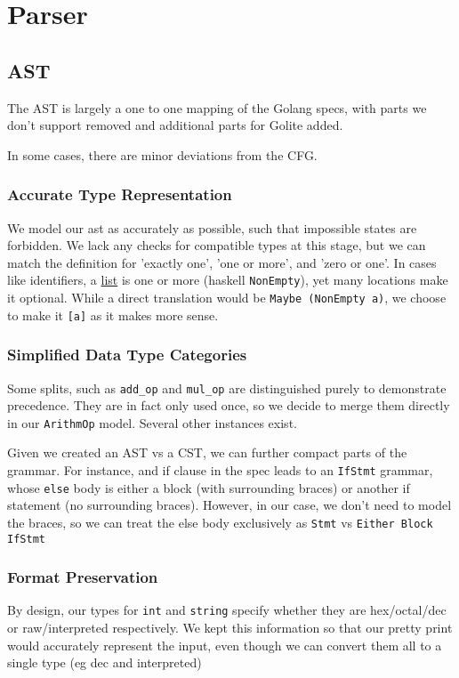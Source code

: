 \documentclass[11pt]{article}
\begin{document}
\section{Parser}
\label{sec:orgbc2e7ad}
\subsection{AST}
\label{sec:orgb539d01}
The AST is largely a one to one mapping of the Golang specs, with
parts we don't support removed and additional parts for Golite added.

In some cases, there are minor deviations from the CFG.
\subsubsection{Accurate Type Representation}
\label{sec:org6de96ff}
We model our ast as accurately as possible, such that impossible
states are forbidden. We lack any checks for compatible types at
this stage, but we can match the definition for 'exactly one', 'one
or more', and 'zero or one'. In cases like identifiers, a \href{https://golang.org/ref/spec\#IdentifierList}{list} is
one or more (haskell \texttt{NonEmpty}), yet many locations make it
optional. While a direct translation would be \texttt{Maybe (NonEmpty a)},
we choose to make it \texttt{[a]} as it makes more sense.
\subsubsection{Simplified Data Type Categories}
\label{sec:org3918547}
Some splits, such as \texttt{add\_op} and \texttt{mul\_op} are distinguished
purely to demonstrate precedence. They are in fact only used once,
so we decide to merge them directly in our \texttt{ArithmOp}
model. Several other instances exist.

Given we created an AST vs a CST, we can further compact parts of
the grammar. For instance, and if clause in the spec leads to an
\texttt{IfStmt} grammar, whose \texttt{else} body is either a block (with
surrounding braces) or another if statement (no surrounding
braces). However, in our case, we don't need to model the braces,
so we can treat the else body exclusively as \texttt{Stmt} vs \texttt{Either
    Block IfStmt}
\subsubsection{Format Preservation}
\label{sec:org022b5b8}
By design, our types for \texttt{int} and \texttt{string} specify whether they
are hex/octal/dec or raw/interpreted respectively. We kept this
information so that our pretty print would accurately represent
the input, even though we can convert them all to a single type
(eg dec and interpreted)
\end{document}
